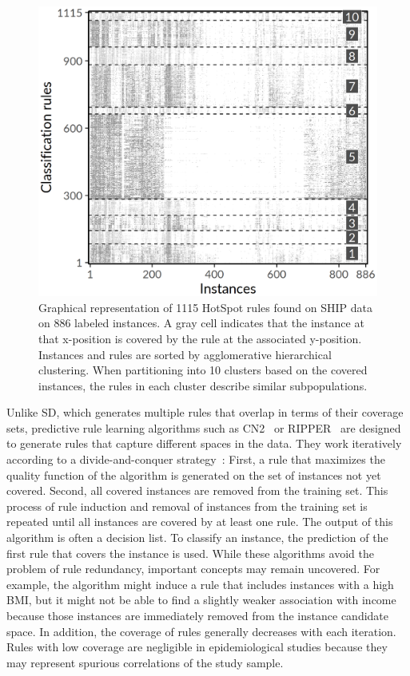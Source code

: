\documentclass[
  oneside]{book}
\begin{document}
\begin{figure}[htbp]

{\centering \includegraphics[width=0.6\linewidth]{figures/04-rule-overlap-heatmap} 

}

\caption{Graphical representation of 1115 HotSpot rules found on SHIP data on 886 labeled instances. A gray cell indicates that the instance at that x-position is covered by the rule at the associated y-position. Instances and rules are sorted by agglomerative hierarchical clustering. When partitioning into 10 clusters based on the covered instances, the rules in each cluster describe similar subpopulations.}\label{fig:04-rule-overlap-heatmap}
\end{figure}

Unlike SD, which generates multiple rules that overlap in terms of their coverage sets, predictive rule learning algorithms such as CN2~\autocite{Clark:CN289} or RIPPER~\autocite{Cohen:RIPPER95} are designed to generate rules that capture different spaces in the data.
They work iteratively according to a divide-and-conquer strategy~\autocite{Fuernkranz:12}:
First, a rule that maximizes the quality function of the algorithm is generated on the set of instances not yet covered.
Second, all covered instances are removed from the training set.
This process of rule induction and removal of instances from the training set is repeated until all instances are covered by at least one rule.
The output of this algorithm is often a decision list.
To classify an instance, the prediction of the first rule that covers the instance is used.
While these algorithms avoid the problem of rule redundancy, important concepts may remain uncovered.
For example, the algorithm might induce a rule that includes instances with a high BMI, but it might not be able to find a slightly weaker association with income because those instances are immediately removed from the instance candidate space.
In addition, the coverage of rules generally decreases with each iteration.
Rules with low coverage are negligible in epidemiological studies because they may represent spurious correlations of the study sample.
\end{document}
